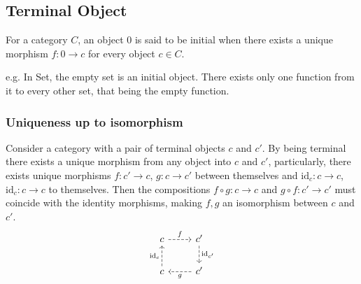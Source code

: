 \subsection{Terminal Object}

For a category $C$, an object $0$ is said to be initial when there exists a
unique morphism $f: 0\to c$ for every object $c\in C$.
\cite{awodey:category_theory}

e.g. In Set, the empty set is an initial object. There exists only one function
from it to every other set, that being the empty function.

\subsubsection*{Uniqueness up to isomorphism}

Consider a category with a pair of terminal objects $c$ and $c'$. By being
terminal there exists a unique morphism from any object into $c$ and $c'$,
particularly, there exists unique morphisms $f: c' \to c$, $g: c \to c'$ between
themselves and $\mathrm{id}_c: c\to c$, $\mathrm{id}_c: c\to c$ to themselves.
Then the compositions $f\circ g:c\to c$ and $g\circ f:c' \to c'$ must coincide
with the identity morphisms, making $f,g$ an isomorphism between $c$ and $c'$.
\[\begin{tikzcd}
	c & {c'} \\
	c & {c'}
	\arrow["{\mathrm{id}_c}", dashed, from=2-1, to=1-1]
	\arrow["f", dashed, from=1-1, to=1-2]
	\arrow["{\mathrm{id}_{c'}}", dashed, from=1-2, to=2-2]
	\arrow["g", dashed, from=2-2, to=2-1]
\end{tikzcd}\]